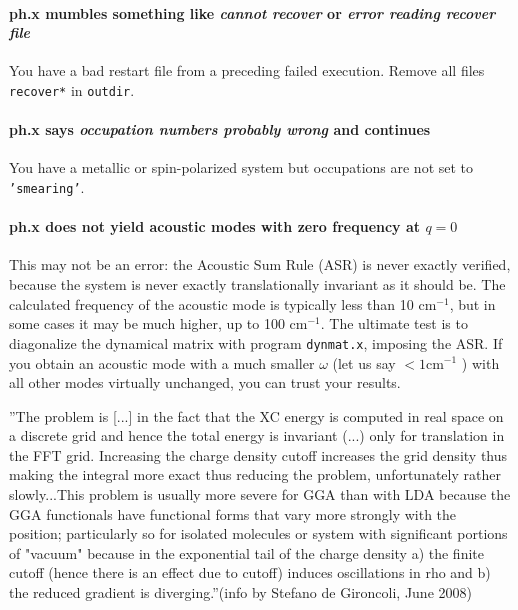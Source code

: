 \documentclass[12pt,a4paper]{article}
\begin{document}
\paragraph{ph.x mumbles something like {\em cannot recover} or {\em error
  reading recover file}} 
You have a bad restart file from a preceding failed execution.
Remove all files \texttt{recover*} in \texttt{outdir}.

\paragraph{ph.x says {\em occupation numbers probably wrong} and
 continues} You have a
metallic or spin-polarized system but occupations are not set to 
\texttt{'smearing'}.

\paragraph{ph.x does not yield acoustic modes with zero frequency at $q=0$}
This may not be an error: the Acoustic Sum Rule (ASR) is never exactly
verified, because the system is never exactly translationally
invariant as it should be.  The calculated frequency of the acoustic
mode is typically less than 10 cm$^{-1}$, but in some cases it may be
much higher, up to 100 cm$^{-1}$. The ultimate test is to diagonalize
the dynamical matrix with program \texttt{dynmat.x}, imposing the ASR. If you
obtain an acoustic mode with a much smaller $\omega$ (let us say 
$< 1 \mbox{cm}^{-1}$ ) 
with all other modes virtually unchanged, you can trust your results.

''The problem is [...] in the fact that the XC 
energy is computed in real space on a discrete grid and hence the
total energy is invariant (...) only for translation in the FFT
grid. Increasing the charge density cutoff increases the grid density
thus making the integral more exact thus reducing the problem,
unfortunately rather slowly...This problem is usually more severe for
GGA  than with LDA because the GGA functionals have functional forms
that vary more strongly with the position; particularly so for
isolated molecules or system with significant portions of "vacuum"
because in the exponential tail of the charge density a) the finite
cutoff  (hence there is an effect due to cutoff) induces oscillations
in rho and b) the reduced gradient is diverging.''(info by Stefano de
Gironcoli, June 2008) 
\end{document}
